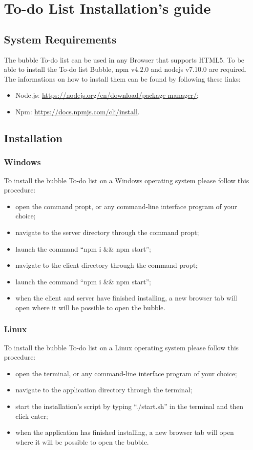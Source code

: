 \section{To-do List Installation's guide}

\subsection{System Requirements}
The bubble To-do list can be used in any Browser that supports HTML5. To be able to install the To-do list Bubble, npm v4.2.0 and nodejs v7.10.0 are required. The informations on how to install them can be found by following these links:
\begin{itemize}
	\item Node.js: \url{https://nodejs.org/en/download/package-manager/};
	\item Npm: \url{https://docs.npmjs.com/cli/install}.
\end{itemize}

\subsection{Installation}
\subsubsection{Windows}

To install the bubble To-do list on a Windows operating system please follow this procedure:
\begin{itemize}
	\item open the command propt, or any command-line interface program of your choice;
	\item navigate to the server directory through the command propt;
	\item launch the command ``npm i \&\& npm start'';
	\item navigate to the client directory through the command propt;
	\item launch the command ``npm i \&\& npm start'';
	\item when the client and server have finished installing, a new browser tab will open where it will be possible to open the bubble.
\end{itemize}

\subsubsection{Linux}
To install the bubble To-do list on a Linux operating system please follow this procedure:
\begin{itemize}
	\item open the terminal, or any command-line interface program of your choice;
	\item navigate to the application directory through the terminal; 
	\item start the installation's script by typing ``./start.sh'' in the terminal and then click enter;
	\item when the application has finished installing, a new browser tab will open where it will be possible to open the bubble.
\end{itemize}

